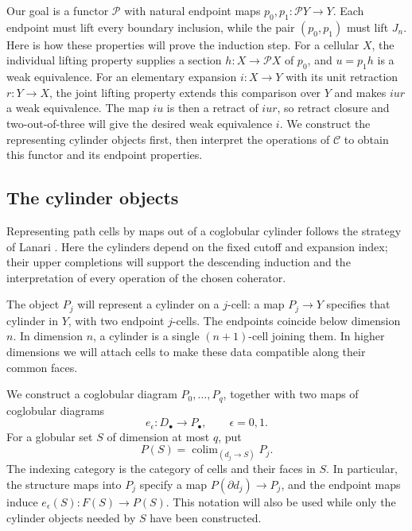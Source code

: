 \documentclass[11pt,letterpaper]{article}
\numberwithin{equation}{section}
\theoremstyle{plain}
\theoremstyle{definition}
\theoremstyle{remark}
\begin{document}
Our goal is a functor \(\mathcal P\) with natural endpoint maps
\(p_0,p_1:\mathcal P Y\to Y\).  Each endpoint must lift every
boundary inclusion, while the pair \((p_0,p_1)\) must lift \(J_n\).
Here is how these properties will prove the induction step.  For a
cellular \(X\), the individual lifting property supplies a section
\(h:X\to\mathcal P X\) of \(p_0\), and \(u=p_1h\) is a weak
equivalence.  For an elementary expansion \(i:X\to Y\) with its
unit retraction \(r:Y\to X\), the joint lifting property extends
this comparison over \(Y\) and makes \(iur\) a weak equivalence.
The map \(iu\) is then a retract of \(iur\), so retract closure
and two-out-of-three will give the desired weak equivalence \(i\).
We construct the representing cylinder objects first, then interpret
the operations of \(\mathcal C\) to obtain this functor and its
endpoint properties.

\subsection{The cylinder objects}

Representing path cells by maps out of a coglobular cylinder follows
the strategy of Lanari
\cite[Definitions~5.2--5.3 and~6.1]{Lanari2020}.
Here the cylinders depend on the fixed cutoff and expansion index;
their upper completions will support the descending induction and
the interpretation of every operation of the chosen coherator.

The object \(P_j\) will represent a cylinder on a \(j\)-cell:
a map \(P_j\to Y\) specifies that cylinder in \(Y\), with two
endpoint \(j\)-cells.  The endpoints coincide below dimension \(n\).
In dimension \(n\), a cylinder is a single \((n+1)\)-cell joining
them.  In higher dimensions we will attach cells to make these data
compatible along their common faces.

We construct a coglobular diagram \(P_0,\ldots,P_q\), together with
two maps of coglobular diagrams
\[
             e_\epsilon:D_\bullet\longrightarrow P_\bullet,
             \qquad \epsilon=0,1.
\]
For a globular set \(S\) of dimension at most \(q\), put
\begin{equation}\label{eq:cylinder-realization}
 P(S)=\operatorname{colim}_{(d_j\longrightarrow S)}P_j.
\end{equation}
The indexing category is the category of cells and their faces in
\(S\).  In particular, the structure maps into \(P_j\) specify a
map \(P(\partial d_j)\to P_j\), and the endpoint maps induce
\(e_\epsilon(S):F(S)\to P(S)\).  This notation will also be used
while only the cylinder objects needed by \(S\) have been constructed.
\end{document}
